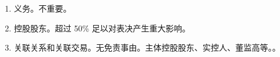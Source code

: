 \begin{enumerate}
\begin{enumerate}
          \item {}。公司受损，公司又不告。
                \begin{enumerate}
                  \item 有限公司对股东资格无要求，股份公司要求连续持股 180 日 + 1\%。
                  \item 起诉时有股东资格，能溯及既往侵权。
                  \item 原则用尽内部救济前提。监事 \dy 董事 \yjt 哪个没犯错找哪个 \yjt 直接起诉。
                  \item 以自己名义，所得利益归公司（入库规则），合理费用归个人。
                  \item 调解需经董事会 \hz 股东会决议。
                  \item {}。
                \end{enumerate}
        \end{enumerate}
  \item 义务。不重要。
  \item 控股股东。超过 50\% \hz 足以对表决产生重大影响。
  \item 关联关系和关联交易。无免责事由。主体控股股东、实控人、董监高等。。
\end{enumerate}

